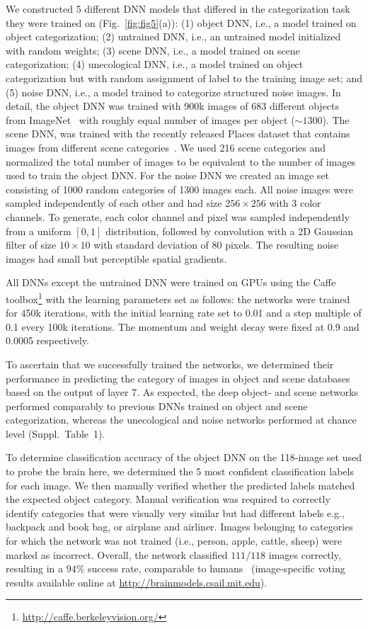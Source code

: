 \documentclass[10pt,twocolumn,letterpaper]{article}
\begin{document}
We constructed 5 different DNN models that differed in the categorization task they were trained on (Fig.~\ref{fig:fig5}(a)): (1) object DNN, i.e., a model trained on object categorization; (2) untrained DNN, i.e., an untrained model initialized with random weights; (3) scene DNN, i.e., a model trained on scene categorization; (4) unecological DNN, i.e., a model trained on object categorization but with random assignment of label to the training image set; and (5) noise DNN, i.e., a model trained to categorize structured noise images. In detail, the object DNN was trained with 900k images of 683 different objects from ImageNet~\cite{deng2009imagenet} with roughly equal number of images per object ($\sim1300$). The scene DNN, was trained with the recently released Places dataset that contains images from different scene categories~\cite{zhou2014learning}. We used 216 scene categories and normalized the total number of images to be equivalent to the number of images used to train the object DNN. For the noise DNN we created an image set consisting of 1000 random categories of 1300 images each. All noise images were sampled independently of each other and had size $256\times256$ with 3 color channels. To generate, each color channel and pixel was sampled independently from a uniform $[0,1]$ distribution, followed by convolution with a 2D Gaussian filter of size $10\times10$ with standard deviation of 80 pixels. The resulting noise images had small but perceptible spatial gradients.

All DNNs except the untrained DNN were trained on GPUs using the Caffe toolbox\footnote{\href{http://caffe.berkeleyvision.org/}{http://caffe.berkeleyvision.org/}} with the learning parameters set as follows: the networks were trained for 450k iterations, with the initial learning rate set to 0.01 and a step multiple of 0.1 every 100k iterations. The momentum and weight decay were fixed at 0.9 and 0.0005 respectively.

To ascertain that we successfully trained the networks, we determined their performance in predicting the category of images in object and scene databases based on the output of layer 7. As expected, the deep object- and scene networks performed comparably to previous DNNs trained on object and scene categorization, whereas the unecological and noise networks performed at chance level (Suppl.~Table~1).

To determine classification accuracy of the object DNN on the 118-image set used to probe the brain here, we determined the 5 most confident classification labels for each image. We then manually verified whether the predicted labels matched the expected object category. Manual verification was required to correctly identify categories that were visually very similar but had different labels e.g., backpack and book bag, or airplane and airliner. Images belonging to categories for which the network was not trained (i.e., person, apple, cattle, sheep) were marked as incorrect. Overall, the network classified $111/118$ images correctly, resulting in a $94\%$ success rate, comparable to humans~\cite{russakovsky2014imagenet} (image-specific voting results available online at \href{http://brainmodels.csail.mit.edu}{http://brainmodels.csail.mit.edu}).
\end{document}
